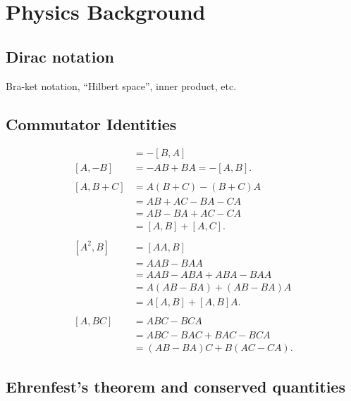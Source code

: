 \chapter{Physics Background}\label{ch:physics_background}

\section{Dirac notation}
Bra-ket notation, ``Hilbert space'', inner product, etc.

\section{Commutator Identities}
\begin{align}
    [A,B] &= -[B,A] \label{eq:BA} \\
    [A,-B] &= -AB + BA = -[A,B].\label{eq:AmB} \\
    \nonumber\\
    [A,B+C] 
        &= A(B+C) - (B+C)A \nonumber\\
        &= AB + AC - BA - CA \nonumber\\
        &= AB - BA + AC - CA \nonumber\\
        &= [A,B] + [A,C]. \label{eq:ABpC} \\
    \nonumber\\
    [A^2,B] 
        &= [AA,B] \nonumber\\
        &= AAB - BAA \nonumber\\
        &= AAB - ABA + ABA - BAA \nonumber\\
        &= A(AB-BA) + (AB-BA)A \nonumber\\
        &= A[A,B] + [A,B]A.\label{eq:A2B}\\
    \nonumber\\
    [A,BC]
        &= ABC - BCA \nonumber\\
        &= ABC - BAC + BAC - BCA \nonumber\\
        &= (AB - BA)C + B(AC - CA).\label{eq:ABC}
\end{align}

\section{Ehrenfest's theorem and conserved quantities}\label{sec:conserved_quantities}

